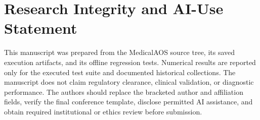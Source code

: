 \documentclass[a4paper,conference]{IEEEtran}
\begin{document}
\section*{Research Integrity and AI-Use Statement}
This manuscript was prepared from the MedicalAOS source tree, its saved execution artifacts, and its offline regression tests. Numerical results are reported only for the executed test suite and documented historical collections. The manuscript does not claim regulatory clearance, clinical validation, or diagnostic performance. The authors should replace the bracketed author and affiliation fields, verify the final conference template, disclose permitted AI assistance, and obtain required institutional or ethics review before submission.



\end{document}
